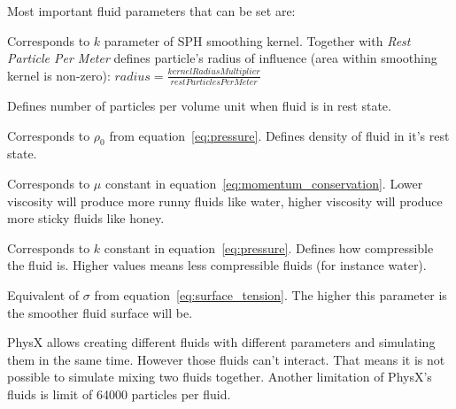 Most important fluid parameters that can be set are:
\begin{description}\itemsep1pt
\item[Kernel Radius Multiplier] Corresponds to $k$ parameter of SPH smoothing kernel. Together with \textit{Rest Particle Per Meter} defines particle's radius of influence (area within smoothing kernel is non-zero): $radius = \frac{kernelRadiusMultiplier}{restParticlesPerMeter}$
\item[Rest Particles Per Meter] Defines number of particles per volume unit when fluid is in rest state.
\item[Rest Density] Corresponds to $\rho_0$ from equation~\ref{eq:pressure}. Defines density of fluid in it's rest state.
\item[Viscosity] Corresponds to $\mu$ constant in equation~\ref{eq:momentum_conservation}. Lower viscosity will produce more runny fluids like water, higher viscosity will produce more sticky fluids like honey.
\item[Stiffness] Corresponds to $k$ constant in equation~\ref{eq:pressure}. Defines how compressible the fluid is. Higher values means less compressible fluids (for instance water). 
\item[Surface Tension] Equivalent of $\sigma$ from equation~\ref{eq:surface_tension}. The higher this parameter is the smoother fluid surface will be. 
\end{description}

PhysX allows creating different fluids with different parameters and simulating them in the same time. However those fluids can't interact. That means it is not possible to simulate mixing two fluids together. Another limitation of PhysX's fluids is limit of 64000 particles per fluid.



